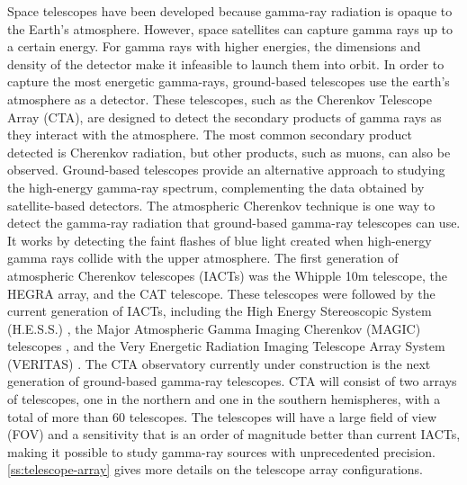 Space telescopes have been developed because gamma-ray radiation is opaque to the Earth's atmosphere. However, space satellites can capture gamma rays up to a certain energy. For gamma rays with higher energies, the dimensions and density of the detector make it infeasible to launch them into orbit. In order to capture the most energetic gamma-rays, ground-based telescopes use the earth's atmosphere as a detector. These telescopes, such as the Cherenkov Telescope Array (CTA), are designed to detect the secondary products of gamma rays as they interact with the atmosphere. The most common secondary product detected is Cherenkov radiation, but other products, such as muons, can also be observed. Ground-based telescopes provide an alternative approach to studying the high-energy gamma-ray spectrum, complementing the data obtained by satellite-based detectors. The atmospheric Cherenkov technique is one way to detect the gamma-ray radiation that ground-based gamma-ray telescopes can use. It works by detecting the faint flashes of blue light created when high-energy gamma rays collide with the upper atmosphere. The first generation of atmospheric Cherenkov telescopes (IACTs) was the Whipple 10m telescope, the HEGRA array, and the CAT telescope. These telescopes were followed by the current generation of IACTs, including the High Energy Stereoscopic System (H.E.S.S.) \cite{hess_2000}, the Major Atmospheric Gamma Imaging Cherenkov (MAGIC) telescopes \cite{magic_1999}, and the Very Energetic Radiation Imaging Telescope Array System (VERITAS) \cite{weekes2002very}. The CTA observatory currently under construction is the next generation of ground-based gamma-ray telescopes. CTA will consist of two arrays of telescopes, one in the northern and one in the southern hemispheres, with a total of more than 60 telescopes. The telescopes will have a large field of view (FOV) and a sensitivity that is an order of magnitude better than current IACTs, making it possible to study gamma-ray sources with unprecedented precision. \autoref{ss:telescope-array} gives more details on the telescope array configurations.

